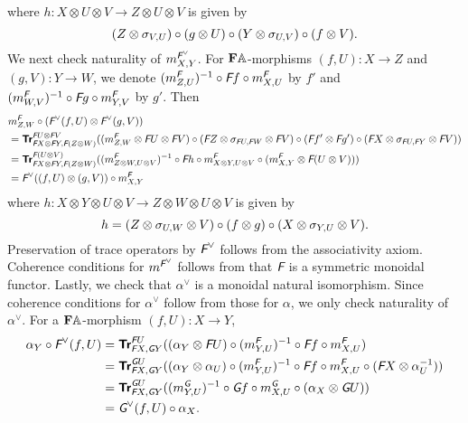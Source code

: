 where \(h \colon X \otimes U \otimes V \to Z \otimes U \otimes V\) is given by
\begin{equation*}
  (Z \otimes \sigma_{V,U}) \circ (g \otimes U) \circ (Y \otimes \sigma_{U,V})
  \circ (f \otimes V).
\end{equation*}
We next check naturality of \(m^{\textit{\textsf{F}}^{\vee}}_{X,Y}\). For
\(\mathbf{F}\mathbb{A}\)-morphisms \((f,U) \colon X \to Z\) and \((g,V) \colon Y
\to W\), we denote \((m^{\textit{\textsf{F}}}_{Z,U})^{-1} \circ \textit{\textsf{F}}f \circ m^{\textit{\textsf{F}}}_{X,U}\) by
\(f'\) and \((m_{W,V}^{\textit{\textsf{F}}})^{-1} \circ \textit{\textsf{F}}g \circ m^{\textit{\textsf{F}}}_{Y,V}\) by \(g'\). Then
\begin{align*}
  & m^{\textit{\textsf{F}}}_{Z,W} \circ (\textit{\textsf{F}}^{\vee}(f,U) \otimes \textit{\textsf{F}}^{\vee}(g,V)) \\
  &= {\normalfont\textsf{\textbf{Tr}}}^{\textit{\textsf{F}}U \otimes \textit{\textsf{F}}V}_{\textit{\textsf{F}}X \otimes \textit{\textsf{F}}Y,\textit{\textsf{F}}(Z \otimes W)}
  ((m^{\textit{\textsf{F}}}_{Z,W} \otimes \textit{\textsf{F}}U \otimes \textit{\textsf{F}}V) \circ
  (\textit{\textsf{F}}Z \otimes \sigma_{\textit{\textsf{F}}U,\textit{\textsf{F}}W} \otimes \textit{\textsf{F}}V) \circ
  (\textit{\textsf{F}}f' \otimes \textit{\textsf{F}}g') \circ
  (\textit{\textsf{F}}X \otimes \sigma_{\textit{\textsf{F}}U,\textit{\textsf{F}}Y} \otimes \textit{\textsf{F}}V)) \\
  &= {\normalfont\textsf{\textbf{Tr}}}^{\textit{\textsf{F}}(U \otimes V)}_{\textit{\textsf{F}}X \otimes \textit{\textsf{F}}Y,\textit{\textsf{F}}(Z \otimes W)}
  ((m_{Z \otimes W, U \otimes V}^{\textit{\textsf{F}}})^{-1} \circ
  \textit{\textsf{F}}h \circ
  m_{X \otimes Y, U \otimes V}^{\textit{\textsf{F}}} \circ
  (m_{X,Y}^{\textit{\textsf{F}}} \otimes \textit{\textsf{F}}(U \otimes V))) \\
  &= \textit{\textsf{F}}^{\vee}((f,U) \otimes (g,V)) \circ m^{\textit{\textsf{F}}}_{X,Y}
\end{align*}
where \(h \colon X \otimes Y \otimes U \otimes V \to Z \otimes W \otimes U \otimes V\)
is given by
\begin{equation*}
  h = (Z \otimes \sigma_{U,W} \otimes V) \circ (f \otimes g) \circ
  (X \otimes \sigma_{Y,U} \otimes V).
\end{equation*}
Preservation of trace operators by \(\textit{\textsf{F}}^{\vee}\) follows from
the associativity axiom. Coherence conditions for
\(m^{\textit{\textsf{F}}^{\vee}}\) follows from that \(\textit{\textsf{F}}\) is a symmetric
monoidal functor. Lastly, we check that \(\alpha^{\vee}\) is a
monoidal natural isomorphism. Since coherence conditions for
\(\alpha^{\vee}\) follow from those for \(\alpha\), we only check
naturality of \(\alpha^{\vee}\). For a \(\mathbf{F}\mathbb{A}\)-morphism \((f,U)
\colon X \to Y\),
\begin{align*}
  \alpha_{Y} \circ \textit{\textsf{F}}^{\vee}(f,U)
  &= {\normalfont\textsf{\textbf{Tr}}}^{\textit{\textsf{F}}U}_{\textit{\textsf{F}}X,\textit{\textsf{G}}Y}
  ((\alpha_{Y} \otimes \textit{\textsf{F}}U) \circ
  (m^{\textit{\textsf{F}}}_{Y,U})^{-1} \circ \textit{\textsf{F}}f \circ m^{\textit{\textsf{F}}}_{X,U}) \\
  &= {\normalfont\textsf{\textbf{Tr}}}^{\textit{\textsf{G}}U}_{\textit{\textsf{F}}X,\textit{\textsf{G}}Y}((\alpha_{Y} \otimes \alpha_{U}) \circ
  (m^{\textit{\textsf{F}}}_{Y,U})^{-1} \circ \textit{\textsf{F}}f \circ m^{\textit{\textsf{F}}}_{X,U}
  \circ (\textit{\textsf{F}}X \otimes \alpha^{-1}_{U})) \\
  &= {\normalfont\textsf{\textbf{Tr}}}^{\textit{\textsf{G}}U}_{\textit{\textsf{F}}X,\textit{\textsf{G}}Y}((m^{\textit{\textsf{G}}}_{Y,U})^{-1} \circ
  \textit{\textsf{G}}f \circ m^{\textit{\textsf{G}}}_{X,U}
  \circ (\alpha_{X} \otimes \textit{\textsf{G}}U)) \\
  &= \textit{\textsf{G}}^{\vee} (f,U) \circ \alpha_{X}.
\end{align*}

